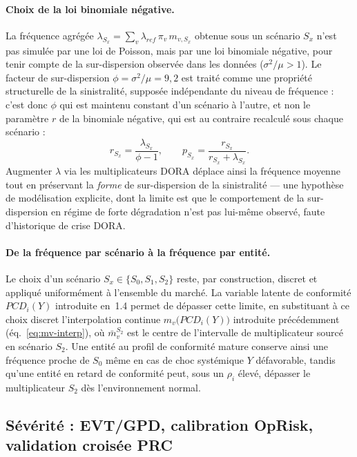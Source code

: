 \documentclass[11pt,a4paper]{article}
\theoremstyle{navystyle}
\theoremstyle{navydef}
\begin{document}
\paragraph{Choix de la loi binomiale négative.} La fréquence agrégée
$\lambda_{S_x} = \sum_v \lambda_{ref}\,\pi_v\, m_{v,S_x}$ obtenue sous un
scénario $S_x$ n'est pas simulée par une loi de Poisson, mais par une loi
binomiale négative, pour tenir compte de la sur-dispersion observée dans les
données ($\sigma^2/\mu > 1$). Le facteur de sur-dispersion
$\phi = \sigma^2/\mu = 9{,}2$ est traité comme une propriété structurelle de
la sinistralité, supposée indépendante du niveau de fréquence : c'est donc
$\phi$ qui est maintenu constant d'un scénario à l'autre, et non le
paramètre $r$ de la binomiale négative, qui est au contraire recalculé sous
chaque scénario :
\begin{equation}
r_{S_x} = \frac{\lambda_{S_x}}{\phi - 1},
\qquad
p_{S_x} = \frac{r_{S_x}}{r_{S_x} + \lambda_{S_x}}.
\end{equation}
Augmenter $\lambda$ via les multiplicateurs DORA déplace ainsi la fréquence
moyenne tout en préservant la \emph{forme} de sur-dispersion de la
sinistralité --- une hypothèse de modélisation explicite, dont la limite est
que le comportement de la sur-dispersion en régime de forte dégradation
n'est pas lui-même observé, faute d'historique de crise DORA.

\paragraph{De la fréquence par scénario à la fréquence par entité.} Le choix
d'un scénario $S_x \in \{S_0, S_1, S_2\}$ reste, par construction, discret et
appliqué uniformément à l'ensemble du marché. La variable latente de
conformité $PCD_i(Y)$ introduite en~1.4 permet de dépasser cette
limite, en substituant à ce choix discret l'interpolation continue
$m_v\bigl(PCD_i(Y)\bigr)$ introduite précédemment (éq.~\eqref{eq:mv-interp}),
où $\bar{m}_v^{S_2}$ est le centre de l'intervalle de multiplicateur sourcé
en scénario $S_2$. Une entité au profil de conformité mature conserve ainsi
une fréquence proche de $S_0$ même en cas de choc systémique $Y$
défavorable, tandis qu'une entité en retard de conformité peut, sous un
$\rho_i$ élevé, dépasser le multiplicateur $S_2$ dès l'environnement normal.

\subsection{Sévérité : EVT/GPD, calibration OpRisk, validation croisée PRC}
\end{document}
